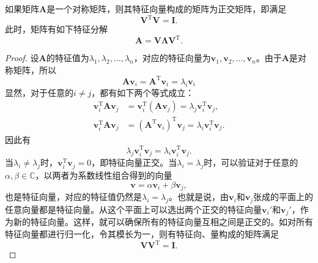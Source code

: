 \begin{theorem}[对称矩阵的特征分解]\label{thm:symmetric-eigen-decomposition}
    如果矩阵\( \mathbf{A} \)是一个对称矩阵，则其特征向量构成的矩阵为正交矩阵，即满足
    \[
        \mathbf{V}^{\mathrm{T}} \mathbf{V} = \mathbf{I}.
    \]
    此时，矩阵有如下特征分解
    \[
        \mathbf{A} = \mathbf{V} \mathbf{\Lambda} \mathbf{V}^{\mathrm{T}}.
    \]
\end{theorem}
\begin{proof}
    设\( \mathbf{A} \)的特征值为\( \lambda_1, \lambda_2, \ldots, \lambda_n \)，对应的特征向量为\( \bm{v}_1, \bm{v}_2, \ldots, \bm{v}_n \)。由于\( \mathbf{A} \)是对称矩阵，所以
    \[
        \mathbf{A} \bm{v}_i = \mathbf{A}^{\mathrm{T}} \bm{v}_i = \lambda_i \bm{v}_i
    \]
    显然，对于任意的\( i \neq j \)，都有如下两个等式成立：
    \[
        \begin{split}
            \bm{v}_i^{\mathrm{T}} \mathbf{A} \bm{v}_j & =  \bm{v}_i^{\mathrm{T}} (\mathbf{A} \bm{v}_j)= \lambda_j \bm{v}_i^{\mathrm{T}} \bm{v}_j,                         \\
            \bm{v}_i^{\mathrm{T}} \mathbf{A} \bm{v}_j & = \left(\mathbf{A}^{\mathrm{T}} \bm{v}_i\right)^{\mathrm{T}} \bm{v}_j = \lambda_i \bm{v}_i^{\mathrm{T}} \bm{v}_j.
        \end{split}
    \]
    因此有
    \[
        \lambda_j \bm{v}_i^{\mathrm{T}} \bm{v}_j = \lambda_i \bm{v}_i^{\mathrm{T}} \bm{v}_j.
    \]
    当\( \lambda_i \neq \lambda_j \)时，\( \bm{v}_i^{\mathrm{T}} \bm{v}_j = 0 \)，即特征向量正交。当\( \lambda_i = \lambda_j \)时，可以验证对于任意的\( \alpha, \beta \in \mathbb{C} \)，以两者为系数线性组合得到的向量
    \[
        \bm{v} = \alpha \bm{v}_i + \beta \bm{v}_j,
    \]
    也是特征向量，对应的特征值仍然是\( \lambda_i = \lambda_j \)。也就是说，由\( \bm{v}_i \)和\( \bm{v}_j \)张成的平面上的任意向量都是特征向量。从这个平面上可以选出两个正交的特征向量\( \bm{v}_i' \)和\( \bm{v}_j' \)，作为新的特征向量。这样，就可以确保所有的特征向量互相之间是正交的。如对所有特征向量都进行归一化，令其模长为一，则有特征向、量构成的矩阵满足
    \[
        \mathbf{V} \mathbf{V}^{\mathrm{T}} = \mathbf{I}.
    \]
\end{proof}

